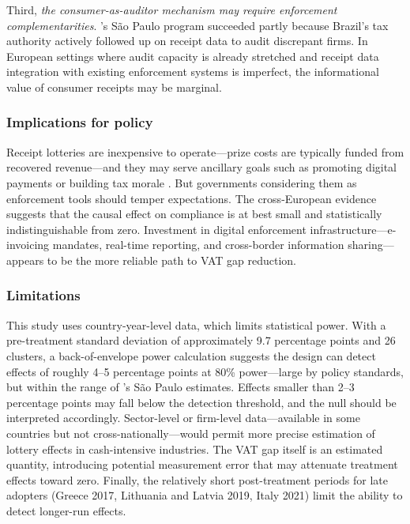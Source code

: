 \documentclass[12pt]{article}
\begin{document}
Third, \textit{the consumer-as-auditor mechanism may require enforcement complementarities}. \citet{naritomi2019}'s S\~{a}o Paulo program succeeded partly because Brazil's tax authority actively followed up on receipt data to audit discrepant firms. In European settings where audit capacity is already stretched and receipt data integration with existing enforcement systems is imperfect, the informational value of consumer receipts may be marginal.

\subsubsection*{Implications for policy} Receipt lotteries are inexpensive to operate---prize costs are typically funded from recovered revenue---and they may serve ancillary goals such as promoting digital payments or building tax morale \citep{torgler2007}. But governments considering them as enforcement tools should temper expectations. The cross-European evidence suggests that the causal effect on compliance is at best small and statistically indistinguishable from zero. Investment in digital enforcement infrastructure---e-invoicing mandates, real-time reporting, and cross-border information sharing---appears to be the more reliable path to VAT gap reduction.

\subsubsection*{Limitations} This study uses country-year-level data, which limits statistical power. With a pre-treatment standard deviation of approximately 9.7 percentage points and 26 clusters, a back-of-envelope power calculation suggests the design can detect effects of roughly 4--5 percentage points at 80\% power---large by policy standards, but within the range of \citet{naritomi2019}'s S\~{a}o Paulo estimates. Effects smaller than 2--3 percentage points may fall below the detection threshold, and the null should be interpreted accordingly. Sector-level or firm-level data---available in some countries but not cross-nationally---would permit more precise estimation of lottery effects in cash-intensive industries. The VAT gap itself is an estimated quantity, introducing potential measurement error that may attenuate treatment effects toward zero. Finally, the relatively short post-treatment periods for late adopters (Greece 2017, Lithuania and Latvia 2019, Italy 2021) limit the ability to detect longer-run effects.
\end{document}
